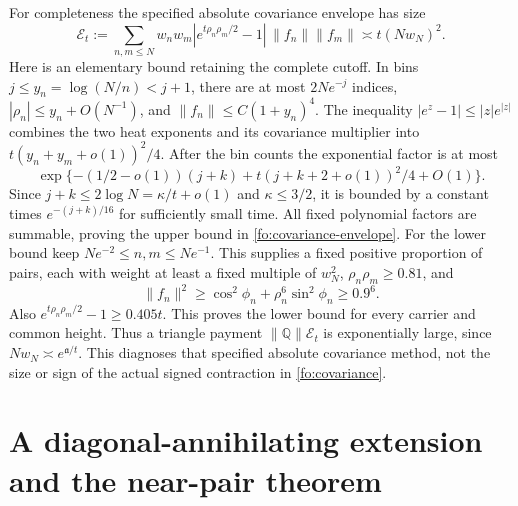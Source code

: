 \documentclass[11pt]{article}
\numberwithin{equation}{section}
\theoremstyle{definition}
\theoremstyle{remark}
\begin{document}
For completeness the specified absolute covariance envelope has size
\begin{equation}
\mathcal E_t:=\sum_{n,m\le N}w_nw_m
 |e^{t\rho_n\rho_m/2}-1|\,\|f_n\|\|f_m\|
 \asymp t(Nw_N)^2.
\label{fo:covariance-envelope}
\end{equation}
Here is an elementary bound retaining the complete cutoff.  In bins
$j\le y_n=\log(N/n)<j+1$, there are at most $2Ne^{-j}$ indices,
$|\rho_n|\le y_n+O(N^{-1})$, and
$\|f_n\|\le C(1+y_n)^4$.  The inequality
$|e^z-1|\le|z|e^{|z|}$ combines the two heat exponents and its
covariance multiplier into $t(y_n+y_m+o(1))^2/4$.
After the bin counts the exponential factor is at most
\begin{equation}
\exp\{-(1/2-o(1))(j+k)+t(j+k+2+o(1))^2/4+O(1)\}.
\end{equation}
Since $j+k\le2\log N=\kappa/t+o(1)$ and $\kappa\le3/2$,
it is bounded by a constant times $e^{-(j+k)/16}$ for sufficiently
small time.  All fixed polynomial factors are summable, proving the
upper bound in \eqref{fo:covariance-envelope}.  For the lower bound
keep $Ne^{-2}\le n,m\le Ne^{-1}$.  This supplies a fixed positive
proportion of pairs, each with weight at least a fixed multiple of
$w_N^2$, $\rho_n\rho_m\ge0.81$, and
\begin{equation}
\|f_n\|^2\ge\cos^2\phi_n+\rho_n^6\sin^2\phi_n\ge0.9^6.
\end{equation}
Also $e^{t\rho_n\rho_m/2}-1\ge0.405t$.
This proves the lower bound for every carrier and common height.
Thus a triangle payment $\|\mathbb Q\|\mathcal E_t$ is exponentially
large, since $Nw_N\asymp e^{\mathfrak a/t}$.  This diagnoses that
specified absolute covariance method, not the size or sign of the
actual signed contraction in \eqref{fo:covariance}.

\section{A diagonal-annihilating extension and the near-pair theorem}
\label{fo:annihilation}
\end{document}
